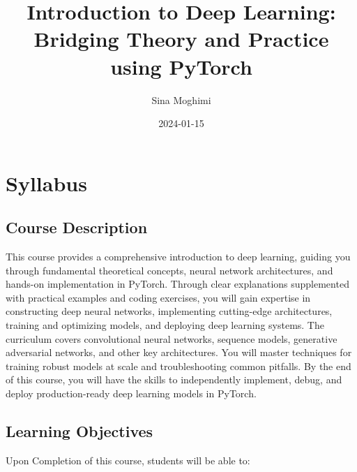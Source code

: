 \documentclass[
]{book}
\title{Introduction to Deep Learning: Bridging Theory and Practice using PyTorch}
\author{Sina Moghimi}
\date{2024-01-15}
\begin{document}
\maketitle

{
\setcounter{tocdepth}{1}
\tableofcontents
}
\hypertarget{syllabus}{%
\chapter{Syllabus}\label{syllabus}}

\hypertarget{course-description}{%
\section{Course Description}\label{course-description}}

This course provides a comprehensive introduction to deep learning, guiding you through fundamental theoretical concepts, neural network architectures, and hands-on implementation in PyTorch. Through clear explanations supplemented with practical examples and coding exercises, you will gain expertise in constructing deep neural networks, implementing cutting-edge architectures, training and optimizing models, and deploying deep learning systems. The curriculum covers convolutional neural networks, sequence models, generative adversarial networks, and other key architectures. You will master techniques for training robust models at scale and troubleshooting common pitfalls. By the end of this course, you will have the skills to independently implement, debug, and deploy production-ready deep learning models in PyTorch.

\hypertarget{learning-objectives}{%
\section{Learning Objectives}\label{learning-objectives}}

Upon Completion of this course, students will be able to:
\end{document}
